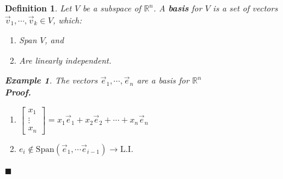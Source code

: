 \documentclass[12pt, a4paper]{article}
\newtheorem{df}{Definition}[subsection]
\newtheorem{eg}{Example}[subsection]
\newenvironment*{prf}{\indent\textbf{\textit{Proof. }}}{\hfill $\blacksquare$\par}
\def\R{{\mathbb{R}}}
\def\Span{\mathrm{Span}}
\def\vecv{\vec{v}}
\def\vece{\vec{e}}
\def\LI{\mathrm{L.I.}}
\begin{document}
\begin{df}
	Let $V$ be a subspace of $\R^n$. A \textbf{basis} for $V$ is a set of vectors $\vecv_1,\cdots,\vecv_k\in V$, which: 
	\begin{enumerate}
		\item Span $V$, and
		\item Are linearly independent. 
	\end{enumerate}
	\begin{eg}
		The vectors $\vece_1,\cdots,\vece_n$ are a basis for $\R^n$\\
		\begin{prf}
			\begin{enumerate}
				\item $\begin{bmatrix}x_1\\\vdots\\x_n\end{bmatrix}=x_1\vece_1+x_2\vece_2+\cdots+x_n\vece_n$
				\item $e_i\notin\Span(\vece_1,\cdots\vece_{i-1})\rightarrow\LI$	
			\end{enumerate}
		\end{prf}
	\end{eg}
\end{df}
\end{document}
